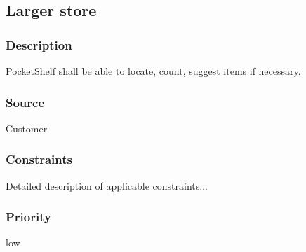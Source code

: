 

\subsection{Larger store}
\subsubsection{Description}
PocketShelf shall be able to locate, count, suggest items if necessary.
\subsubsection{Source}
Customer
\subsubsection{Constraints}
Detailed description of applicable constraints...

\subsubsection{Priority}
low

